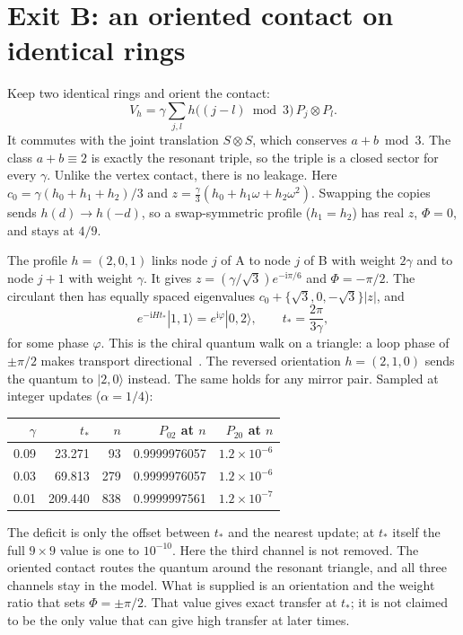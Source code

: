 \documentclass[11pt,a4paper]{article}
\newcommand{\ii}{\mathrm i}
\newcommand{\ket}[1]{|#1\rangle}
\begin{document}
\section{Exit B: an oriented contact on identical rings}
Keep two identical rings and orient the contact:
\begin{equation}
 V_h=\gamma\sum_{j,l}h\big((j-l)\bmod3\big)\,P_j\otimes P_l .
\end{equation}
It commutes with the joint translation $S\otimes S$, which conserves
$a+b\bmod3$. The class $a+b\equiv2$ is exactly the resonant triple, so the
triple is a closed sector for every $\gamma$. Unlike the vertex contact,
there is no leakage. Here $c_0=\gamma(h_0+h_1+h_2)/3$ and
$z=\tfrac\gamma3(h_0+h_1\omega+h_2\omega^2)$. Swapping the copies sends
$h(d)\to h(-d)$, so a swap-symmetric profile ($h_1=h_2$) has real $z$,
$\Phi=0$, and stays at $4/9$.

The profile $h=(2,0,1)$ links node $j$ of A to node $j$ of B with weight
$2\gamma$ and to node $j+1$ with weight $\gamma$. It gives
$z=(\gamma/\sqrt3)e^{-\ii\pi/6}$ and $\Phi=-\pi/2$. The circulant then has
equally spaced eigenvalues $c_0+\{\sqrt3,0,-\sqrt3\}|z|$, and
\begin{equation}
 e^{-\ii Ht_*}\ket{1,1}=e^{\ii\varphi}\ket{0,2},\qquad t_*=\frac{2\pi}{3\gamma},
\end{equation}
for some phase $\varphi$. This is the chiral quantum walk on a triangle: a loop phase of
$\pm\pi/2$ makes transport directional~\cite{zimboras}.
The reversed orientation $h=(2,1,0)$ sends the quantum to $\ket{2,0}$
instead. The same holds for any mirror pair. Sampled at integer updates
($\alpha=1/4$):
\begin{center}
\begin{tabular}{rrrrr}\toprule
$\gamma$ & $t_*$ & $n$ & $P_{02}$ at $n$ & $P_{20}$ at $n$\\\midrule
0.09 & 23.271 & 93 & 0.9999976057 & $1.2\times10^{-6}$\\
0.03 & 69.813 & 279 & 0.9999976057 & $1.2\times10^{-6}$\\
0.01 & 209.440 & 838 & 0.9999997561 & $1.2\times10^{-7}$\\\bottomrule
\end{tabular}
\end{center}
The deficit is only the offset between $t_*$ and the nearest update; at
$t_*$ itself the full $9\times9$ value is one to $10^{-10}$. Here the
third channel is not removed. The oriented contact routes the quantum
around the resonant triangle, and all three channels stay in the model.
What is supplied is an orientation and the weight ratio that sets
$\Phi=\pm\pi/2$. That value gives exact transfer at $t_*$; it is not
claimed to be the only value that can give high transfer at later times.
\end{document}
